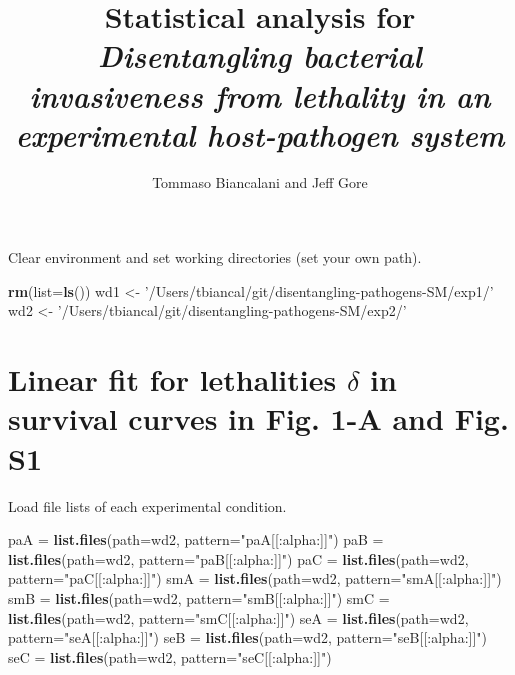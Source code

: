 \documentclass[]{article}
\title{Statistical analysis for \emph{Disentangling bacterial invasiveness from
lethality in an experimental host-pathogen system}}
\author{Tommaso Biancalani and Jeff Gore}
\date{}
\newenvironment{Shaded}{\begin{snugshade}}{\end{snugshade}}
\newcommand{\KeywordTok}[1]{\textcolor[rgb]{0.13,0.29,0.53}{\textbf{#1}}}
\newcommand{\DataTypeTok}[1]{\textcolor[rgb]{0.13,0.29,0.53}{#1}}
\newcommand{\StringTok}[1]{\textcolor[rgb]{0.31,0.60,0.02}{#1}}
\newcommand{\NormalTok}[1]{#1}
\begin{document}
\maketitle

Clear environment and set working directories (set your own path).

\begin{Shaded}
\begin{Highlighting}[]
\KeywordTok{rm}\NormalTok{(}\DataTypeTok{list=}\KeywordTok{ls}\NormalTok{())}
\NormalTok{wd1 <-}\StringTok{ '/Users/tbiancal/git/disentangling-pathogens-SM/exp1/'}
\NormalTok{wd2 <-}\StringTok{ '/Users/tbiancal/git/disentangling-pathogens-SM/exp2/'}
\end{Highlighting}
\end{Shaded}

\section{\texorpdfstring{Linear fit for lethalities \(\delta\) in
survival curves in Fig. 1-A and Fig.
S1}{Linear fit for lethalities \textbackslash{}delta in survival curves in Fig. 1-A and Fig. S1}}\label{linear-fit-for-lethalities-delta-in-survival-curves-in-fig.-1-a-and-fig.-s1}

Load file lists of each experimental condition.

\begin{Shaded}
\begin{Highlighting}[]
\NormalTok{paA =}\StringTok{ }\KeywordTok{list.files}\NormalTok{(}\DataTypeTok{path=}\NormalTok{wd2, }\DataTypeTok{pattern=}\StringTok{"paA[[:alpha:]]"}\NormalTok{)}
\NormalTok{paB =}\StringTok{ }\KeywordTok{list.files}\NormalTok{(}\DataTypeTok{path=}\NormalTok{wd2, }\DataTypeTok{pattern=}\StringTok{"paB[[:alpha:]]"}\NormalTok{)}
\NormalTok{paC =}\StringTok{ }\KeywordTok{list.files}\NormalTok{(}\DataTypeTok{path=}\NormalTok{wd2, }\DataTypeTok{pattern=}\StringTok{"paC[[:alpha:]]"}\NormalTok{)}
\NormalTok{smA =}\StringTok{ }\KeywordTok{list.files}\NormalTok{(}\DataTypeTok{path=}\NormalTok{wd2, }\DataTypeTok{pattern=}\StringTok{"smA[[:alpha:]]"}\NormalTok{)}
\NormalTok{smB =}\StringTok{ }\KeywordTok{list.files}\NormalTok{(}\DataTypeTok{path=}\NormalTok{wd2, }\DataTypeTok{pattern=}\StringTok{"smB[[:alpha:]]"}\NormalTok{)}
\NormalTok{smC =}\StringTok{ }\KeywordTok{list.files}\NormalTok{(}\DataTypeTok{path=}\NormalTok{wd2, }\DataTypeTok{pattern=}\StringTok{"smC[[:alpha:]]"}\NormalTok{)}
\NormalTok{seA =}\StringTok{ }\KeywordTok{list.files}\NormalTok{(}\DataTypeTok{path=}\NormalTok{wd2, }\DataTypeTok{pattern=}\StringTok{"seA[[:alpha:]]"}\NormalTok{)}
\NormalTok{seB =}\StringTok{ }\KeywordTok{list.files}\NormalTok{(}\DataTypeTok{path=}\NormalTok{wd2, }\DataTypeTok{pattern=}\StringTok{"seB[[:alpha:]]"}\NormalTok{)}
\NormalTok{seC =}\StringTok{ }\KeywordTok{list.files}\NormalTok{(}\DataTypeTok{path=}\NormalTok{wd2, }\DataTypeTok{pattern=}\StringTok{"seC[[:alpha:]]"}\NormalTok{)}
\end{Highlighting}
\end{Shaded}
\end{document}
